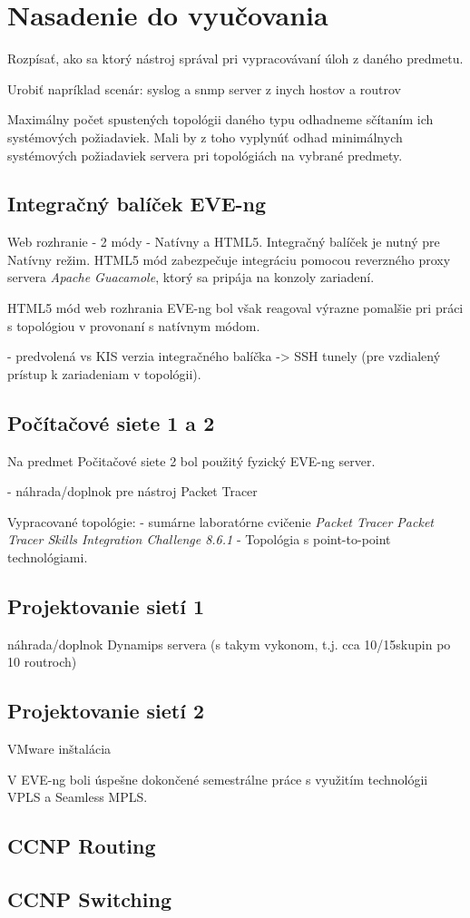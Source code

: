 \chapter{Nasadenie do vyučovania}
\label{chap:nasadenie_do_vyucovania}

Rozpísať, ako sa ktorý nástroj správal pri vypracovávaní úloh z daného predmetu.

Urobiť napríklad scenár: syslog a snmp server z inych hostov a routrov

Maximálny počet spustených topológii daného typu odhadneme sčítaním ich systémových požiadaviek. Mali by z toho vyplynúť odhad minimálnych systémových požiadaviek servera pri topológiách na vybrané predmety.

\section{Integračný balíček EVE-ng}
\label{chap:nasadenie_klient}

Web rozhranie - 2 módy - Natívny a HTML5.
Integračný balíček je nutný pre Natívny režim. HTML5 mód zabezpečuje integráciu pomocou reverzného proxy servera \emph{Apache Guacamole}, ktorý sa pripája na konzoly zariadení.

HTML5 mód web rozhrania EVE-ng bol však reagoval výrazne pomalšie pri práci s topológiou v provonaní s natívnym módom.

- predvolená vs KIS verzia integračného balíčka -> SSH tunely (pre vzdialený prístup k zariadeniam v topológii).

\section{Počítačové siete 1 a 2}

Na predmet Počitačové siete 2 bol použitý fyzický EVE-ng server.

- náhrada/doplnok pre nástroj Packet Tracer

Vypracované topológie:
- sumárne laboratórne cvičenie \emph{Packet Tracer Packet Tracer Skills Integration Challenge 8.6.1}
- Topológia s point-to-point technológiami.

\section{Projektovanie sietí 1}

náhrada/doplnok Dynamips servera (s takym vykonom, t.j. cca 10/15skupin po 10 routroch)

\section{Projektovanie sietí 2}

VMware inštalácia

V EVE-ng boli úspešne dokončené semestrálne práce s využitím technológii VPLS a Seamless MPLS.

\section{CCNP Routing}

\section{CCNP Switching}